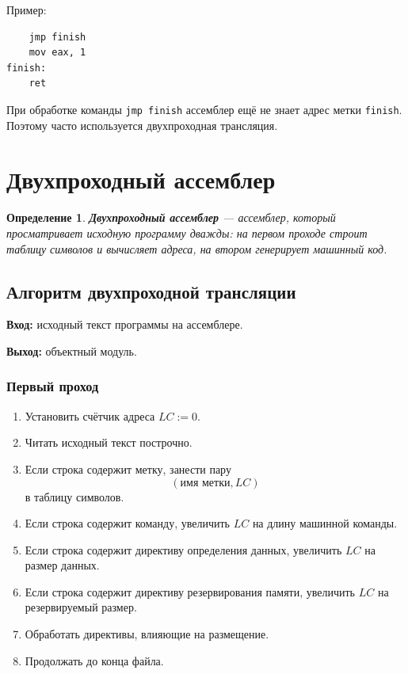 \documentclass[12pt,a4paper]{article}
\newtheorem{definition}{Определение}
\begin{document}
Пример:

\begin{lstlisting}
    jmp finish
    mov eax, 1
finish:
    ret
\end{lstlisting}

При обработке команды \texttt{jmp finish} ассемблер ещё не знает адрес метки \texttt{finish}. Поэтому часто используется двухпроходная трансляция.

\section{Двухпроходный ассемблер}

\begin{definition}
\textbf{Двухпроходный ассемблер} --- ассемблер, который просматривает исходную программу дважды: на первом проходе строит таблицу символов и вычисляет адреса, на втором генерирует машинный код.
\end{definition}

\subsection{Алгоритм двухпроходной трансляции}

\textbf{Вход:} исходный текст программы на ассемблере.

\textbf{Выход:} объектный модуль.

\subsubsection*{Первый проход}

\begin{enumerate}
    \item Установить счётчик адреса $LC := 0$.
    \item Читать исходный текст построчно.
    \item Если строка содержит метку, занести пару
    \[
    (\text{имя метки}, LC)
    \]
    в таблицу символов.
    \item Если строка содержит команду, увеличить $LC$ на длину машинной команды.
    \item Если строка содержит директиву определения данных, увеличить $LC$ на размер данных.
    \item Если строка содержит директиву резервирования памяти, увеличить $LC$ на резервируемый размер.
    \item Обработать директивы, влияющие на размещение.
    \item Продолжать до конца файла.
\end{enumerate}
\end{document}
